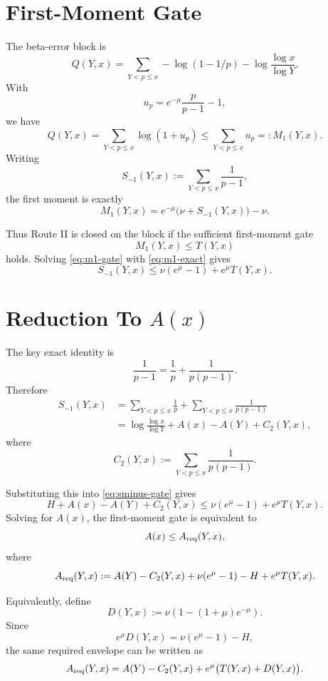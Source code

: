 \documentclass[11pt,a4paper]{article}
\begin{document}
\section{First-Moment Gate}

The beta-error block is
\[
  Q(Y,x)
  =
  \sum_{Y<p\le x}-\log(1-1/p)
  -
  \log\frac{\log x}{\log Y}.
\]
With
\[
  u_p=e^{-\mu}\frac{p}{p-1}-1,
\]
we have
\[
  Q(Y,x)=\sum_{Y<p\le x}\log(1+u_p)\le \sum_{Y<p\le x}u_p=:M_1(Y,x).
\]
Writing
\[
  S_{-1}(Y,x):=\sum_{Y<p\le x}\frac1{p-1},
\]
the first moment is exactly
\begin{equation}\label{eq:m1-exact}
  M_1(Y,x)=e^{-\mu}\bigl(\nu+S_{-1}(Y,x)\bigr)-\nu.
\end{equation}

Thus Route II is closed on the block if the sufficient first-moment gate
\begin{equation}\label{eq:m1-gate}
  M_1(Y,x)\le T(Y,x)
\end{equation}
holds. Solving \eqref{eq:m1-gate} with \eqref{eq:m1-exact} gives
\begin{equation}\label{eq:sminus-gate}
  S_{-1}(Y,x)
  \le
  \nu(e^\mu-1)+e^\mu T(Y,x).
\end{equation}

\section{Reduction To \(A(x)\)}

The key exact identity is
\[
  \frac1{p-1}=\frac1p+\frac1{p(p-1)}.
\]
Therefore
\begin{align*}
  S_{-1}(Y,x)
  &=
  \sum_{Y<p\le x}\frac1p
  +
  \sum_{Y<p\le x}\frac1{p(p-1)}\\
  &=
  \log\frac{\log x}{\log Y}+A(x)-A(Y)+C_2(Y,x),
\end{align*}
where
\[
  C_2(Y,x):=\sum_{Y<p\le x}\frac1{p(p-1)}.
\]

Substituting this into \eqref{eq:sminus-gate} gives
\[
  H+A(x)-A(Y)+C_2(Y,x)
  \le
  \nu(e^\mu-1)+e^\mu T(Y,x).
\]
Solving for \(A(x)\), the first-moment gate is equivalent to
\begin{equation}\label{eq:a-req-direct}
  A(x)\le A_{\rm req}(Y,x),
\end{equation}
where
\begin{equation}\label{eq:a-req}
  A_{\rm req}(Y,x)
  :=
  A(Y)-C_2(Y,x)+\nu(e^\mu-1)-H+e^\mu T(Y,x).
\end{equation}

Equivalently, define
\[
  D(Y,x):=\nu\left(1-(1+\mu)e^{-\mu}\right).
\]
Since
\[
  e^\mu D(Y,x)=\nu(e^\mu-1)-H,
\]
the same required envelope can be written as
\begin{equation}\label{eq:a-req-d}
  A_{\rm req}(Y,x)
  =
  A(Y)-C_2(Y,x)+e^\mu\bigl(T(Y,x)+D(Y,x)\bigr).
\end{equation}
\end{document}
